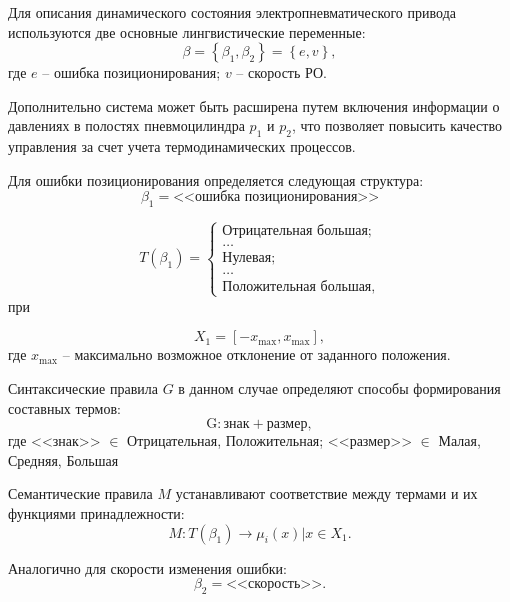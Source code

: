 Для описания динамического состояния электропневматического привода
используются две основные лингвистические переменные:
\begin{equation}
	\beta = \left\{\beta_1, \beta_2\right\} = \left\{e, v\right\},
\end{equation}
где $e$ -- ошибка позиционирования;
$v$ -- скорость РО.

Дополнительно система может быть расширена путем включения информации о
давлениях в полостях пневмоцилиндра $p_1$ и $p_2$, что позволяет повысить
качество управления за счет учета термодинамических процессов.

Для ошибки позиционирования определяется следующая структура:
\begin{equation}
	\beta_1 = \text{<<ошибка позиционирования>>}
\end{equation}

\begin{equation}
	T(\beta_1) =\begin{cases}
		\text{Отрицательная большая}; \\
		\ldots                        \\
		\text{Нулевая}     ;          \\
		\ldots                        \\
		\text{Положительная большая},
	\end{cases}
\end{equation}
при

\begin{equation}
	X_1 = [-x_{\text{max}}, x_{\text{max}}],
\end{equation}
где $x_{\text{max}}$ -- максимально возможное отклонение от заданного положения.

Синтаксические правила $G$ в данном случае определяют способы формирования составных термов:
\begin{equation}
	\text{G}: \text{знак} + \text{размер},
\end{equation}
где <<знак>> $\in$ {Отрицательная, Положительная}; <<размер>> $\in$ {Малая, Средняя, Большая}

Семантические правила $M$ устанавливают соответствие между термами и их функциями принадлежности:
\begin{equation}
	M: T(\beta_1) \rightarrow {\mu_i(x) | x \in X_1}.
\end{equation}

Аналогично для скорости изменения ошибки:
\begin{equation}
	\beta_2 = \text{<<скорость>>}.
\end{equation}

